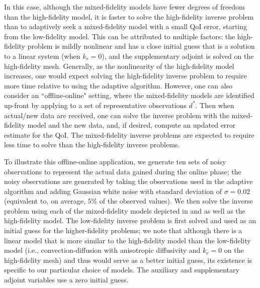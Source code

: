 \documentclass[review,sort&compress]{elsarticle}
\begin{document}
In this case, although the mixed-fidelity models have fewer degrees of freedom than the high-fidelity model, it is faster to solve the high-fidelity inverse problem than to adaptively seek a mixed-fidelity model with a small QoI error, starting from the low-fidelity model. This can be attributed to multiple factors: the high-fidelity problem is mildly nonlinear and has a close initial guess that is a solution to a linear system (when $k_r=0$), and the supplementary adjoint is solved on the high-fidelity mesh. Generally, as the nonlinearity of the high-fidelity model increases, one would expect solving the high-fidelity inverse problem to require more time relative to using the adaptive algorithm. However, one can also consider an ``offline-online" setting, where the mixed-fidelity models are identified up-front by applying  to a set of representative observations $d^*$. Then when actual/new data are received, one can solve the inverse problem with the mixed-fidelity model and the new data, and, if desired, compute an updated error estimate for the QoI. The mixed-fidelity inverse problems are expected to require less time to solve than the high-fidelity inverse problems.

To illustrate this offline-online application, we generate ten sets of noisy observations to represent the actual data gained during the online phase; the noisy observations are generated by taking the observations used in the adaptive algorithm and adding Gaussian white noise with standard deviation of $\sigma=0.02$ (equivalent to, on average, $5\%$ of the observed values). We then solve the inverse problem using each of the mixed-fidelity models depicted in  and  as well as the high-fidelity model. The low-fidelity inverse problem is first solved and used as an initial guess for the higher-fidelity problems; we note that although there is a linear model that is more similar to the high-fidelity model than the low-fidelity model (i.e., convection-diffusion with anisotropic diffusivity and $k_r=0$ on the high-fidelity mesh) and thus would serve as a better initial guess, its existence is specific to our particular choice of models. The auxiliary and supplementary adjoint variables use a zero initial guess.
\end{document}
